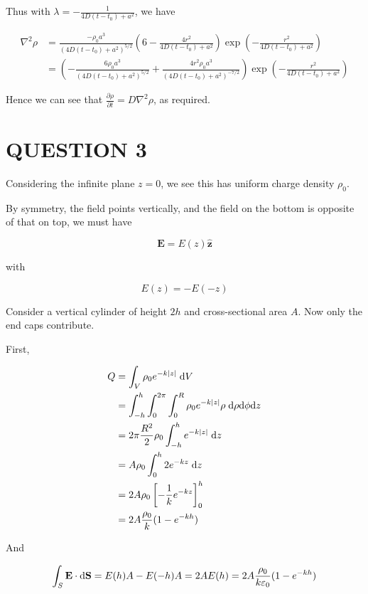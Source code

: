 \documentclass[a4paper]{article}
\begin{document}
Thus with $ \lambda = - \frac{1}{4D(t - t_{0}) + a^{2}}  $, we have 

\begin{align*}
\nabla^{2} \rho  & = \frac{- \rho_{0}a^{3}}{	(4D(t - t_{0}) + a^{2})^{5/2}} \left(  6 - \frac{4 r^{2}}{4D(t - t_{0}) + a^{2}}  \right) \exp \left( - \frac{r^{2}}{4D(t - t_{0}) + a^{2}} \right)  \\
& = \left( -  \frac{6 \rho_{0}a^{3}}{	(4D(t - t_{0}) + a^{2})^{5/2}} + \frac{4 r^{2} \rho_{0}a^{3} }{(4D(t - t_{0}) + a^{2})^{-7/2}} \right) \exp \left( - \frac{r^{2}}{4D(t - t_{0}) + a^{2}} \right)
\end{align*}

Hence we can see that $ \frac{\partial \rho }{\partial t} = D \nabla^{2} \rho  $, as required.



\section{QUESTION 3}

Considering the infinite plane $ z = 0 $, we see this has uniform charge density $ \rho_{0} $. 

By symmetry, the field points vertically, and the field on the bottom is opposite of that on top, we must have

\[ \mathbf{E} = E(z) \hat{\mathbf{z}} \]

with

\[ E(z) = -E(-z) \]

Consider a vertical cylinder of height $ 2h $ and cross-sectional area $ A $. Now only the end caps contribute.

First, 

\begin{align*}
Q & = \int_{V} \rho_{0} e^{-k| z |}  \; \mathrm{d} V \\
& = \int_{-h}^{h} \int_{0}^{2\pi}  \int_{0}^{R} \rho_{0} e^{-k| z |}  \rho \; \mathrm{d} \rho \mathrm{d} \phi \mathrm{d} z \\
& = 2 \pi \frac{R^{2}}{2} \rho_{0} \int_{-h}^{h}  e^{-k| z |}  \;  \mathrm{d} z \\
& =  A \rho_{0} \int_{0}^{h} 2 e^{-kz}   \;  \mathrm{d} z \\
& =  2 A \rho_{0} \left[ - \frac{1}{k} e^{-kz} \right]_{0}^{h} \\
& =  2 A \frac{\rho_{0}}{k} (1 - e^{-kh}) 
\end{align*}

And

\begin{align*}
\int_{S} \mathbf{E} \cdot \mathrm{d} \mathbf{S} & = E(h) A - E(-h) A = 2AE(h)  =  2 A \frac{\rho_{0}}{k \varepsilon_{0}} (1 - e^{-kh}) \\
\end{align*}
\end{document}
